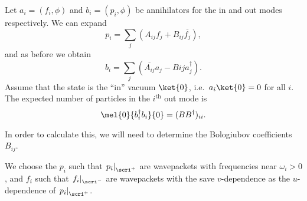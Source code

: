 \documentclass{jknotes}
\begin{document}
\begin{wrapfigure}{l}{0.5\linewidth}
    \centering
\end{wrapfigure}
Let \(a_i = (f_i,\phi)\) and \(b_i = (p_i,\phi)\) be annihilators for the in and out modes respectively. We can expand
\begin{equation}
    p_i = \sum_j\left(A_{ij}f_j + B_{ij}\overline{f_j}\right),
\end{equation}
and as before we obtain
\begin{equation}
    b_i = \sum_j\left(\overline{A_{ij}}a_j - B{ij}a_j^\dagger\right).
\end{equation}
Assume that the state is the ``in'' vacuum \(\ket{0}\), i.e.\ \(a_i \ket{0}=0\) for all \(i\). The expected number of particles in the \(i^\text{th}\) out mode is
\begin{equation}
    \mel{0}{b_i^\dagger b_i}{0} = (BB^\dagger)_{ii}.
\end{equation}

In order to calculate this, we will need to determine the Bologiubov coefficients \(B_{ij}\).

\begin{wrapfigure}{r}{0.4\linewidth}
    \centering
\end{wrapfigure}
We choose the \(p_i\) such that \(\left.p_i\right|_{\scri^+}\) are wavepackets with frequencies near \(\omega_i > 0\), and \(f_i\) such that \(\left.f_i\right|_{\scri^-}\) are wavepackets with the save \(v\)-dependence as the \(u\)-dependence of \(\left.p_i\right|_{\scri^+}\).
\end{document}
